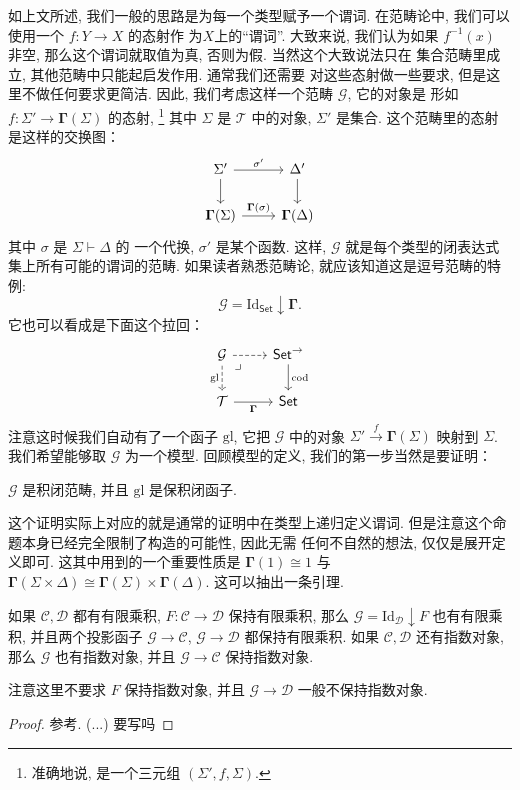 如上文所述, 我们一般的思路是为每一个类型赋予一个谓词.
在范畴论中, 我们可以使用一个 \(f : Y \to X\) 的态射作
为\(X\)上的“谓词”. 大致来说, 我们认为如果 \(f^{-1}(x)\) 非空,
那么这个谓词就取值为真, 否则为假. 当然这个大致说法只在
集合范畴里成立, 其他范畴中只能起启发作用. 通常我们还需要
对这些态射做一些要求, 但是这里不做任何要求更简洁. 因此,
我们考虑这样一个范畴 \(\mathcal G\), 它的对象是
形如 \(f:\Sigma' \to \boldsymbol\Gamma(\Sigma)\) 的态射,%
\footnote{准确地说, 是一个三元组 \((\Sigma', f, \Sigma)\).}
其中 \(\Sigma\) 是 \(\mathcal T\) 中的对象, \(\Sigma'\)
是集合. 这个范畴里的态射是这样的交换图：
\[
\begin{tikzcd}
\Sigma' \ar[r, "\sigma'"] \ar[d] & \Delta' \ar[d] \\
\boldsymbol\Gamma(\Sigma) \ar[r, "\boldsymbol\Gamma(\sigma)"] & \boldsymbol\Gamma(\Delta)
\end{tikzcd}
\]
其中 \(\sigma\) 是 \(\Sigma \vdash \Delta\) 的
一个代换, \(\sigma'\) 是某个函数. 这样, \(\mathcal G\)
就是每个类型的闭表达式集上所有可能的谓词的范畴.
如果读者熟悉范畴论, 就应该知道这是逗号范畴的特例:
\[\mathcal G = \mathrm{Id}_{\mathsf{Set}}\downarrow \boldsymbol\Gamma.\]
它也可以看成是下面这个拉回：
\[
\begin{tikzcd}
\mathcal G \ar[r, dashed] \ar[d, dashed, "\mathrm{gl}"'] \ar[dr, phantom, "\lrcorner", very near start] & \mathsf{Set}^{\to} \ar[d, "\mathrm{cod}"] \\
\mathcal T \ar[r, "\boldsymbol\Gamma"'] & \mathsf{Set}
\end{tikzcd}
\]
注意这时候我们自动有了一个函子 \(\mathrm{gl}\), 它把
\(\mathcal G\) 中的对象 \(\Sigma' \xrightarrow f \boldsymbol\Gamma(\Sigma)\)
映射到 \(\Sigma\). 我们希望能够取 \(\mathcal G\)
为一个模型. 回顾模型的定义, 我们的第一步当然是要证明：
\begin{lemma}
\(\mathcal G\) 是积闭范畴, 并且 \(\mathrm{gl}\)
是保积闭函子.
\end{lemma}
这个证明实际上对应的就是通常的证明中在类型上递归定义谓词.
但是注意这个命题本身已经完全限制了构造的可能性, 因此无需
任何不自然的想法, 仅仅是展开定义即可.
这其中用到的一个重要性质是
\(\boldsymbol\Gamma(1) \cong 1\) 与
\(\boldsymbol\Gamma(\Sigma \times \Delta) \cong \boldsymbol\Gamma(\Sigma) \times \boldsymbol\Gamma(\Delta)\).
这可以抽出一条引理.
\begin{lemma}\label{beginning:glue}
如果 \(\mathcal C, \mathcal D\) 都有有限乘积,
\(F : \mathcal C \to \mathcal D\) 保持有限乘积,
那么 \(\mathcal G = \mathrm{Id}_{\mathcal{D}} \downarrow F\) 也有有限乘积,
并且两个投影函子 \(\mathcal G \to \mathcal C\), \(\mathcal G \to \mathcal D\) 都保持有限乘积.
如果 \(\mathcal C, \mathcal D\) 还有指数对象,
那么 \(\mathcal G\) 也有指数对象, 并且 \(\mathcal G \to \mathcal C\) 保持指数对象.
\end{lemma}
注意这里不要求 \(F\) 保持指数对象, 并且 \(\mathcal G \to \mathcal D\) 一般不保持指数对象.
\begin{proof}
参考\cite[例子 A2.1.12]{johnstone:2008:elephant}.
(...) 要写吗
\end{proof}

